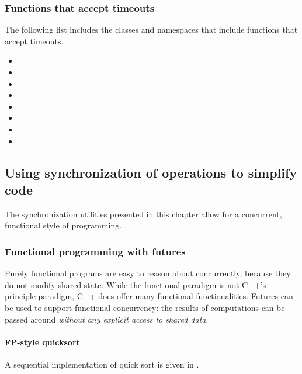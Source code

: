 \subsubsection{Functions that accept timeouts}
The following list includes the classes and namespaces that include functions that accept timeouts. 
\begin{itemize}
  \item {}
  \item {}
  \item {}
  \item {}
  \item {}
  \item {}
  \item {}
  \item {}
\end{itemize}

\subsection{Using synchronization of operations to simplify code}
The synchronization utilities presented in this chapter allow for a concurrent, functional style of programming.

\subsubsection{Functional programming with futures}
Purely functional programs are easy to reason about concurrently, because they do not modify shared state. While the functional paradigm is not C++'s principle paradigm, C++ does offer many functional functionalities. Futures can be used to support functional concurrency: the results of computations can be passed around \emph{without any explicit access to shared data}.

\paragraph{FP-style quicksort}
A sequential implementation of quick sort is given in .

